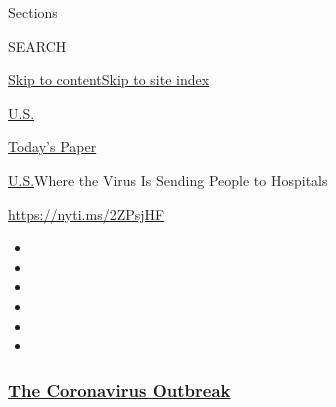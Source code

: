 Sections

SEARCH

\protect\hyperlink{site-content}{Skip to
content}\protect\hyperlink{site-index}{Skip to site index}

\href{https://www.nytimes3xbfgragh.onion/section/us}{U.S.}

\href{https://myaccount.nytimes3xbfgragh.onion/auth/login?response_type=cookie\&client_id=vi}{}

\href{https://www.nytimes3xbfgragh.onion/section/todayspaper}{Today's
Paper}

\href{/section/us}{U.S.}\textbar{}Where the Virus Is Sending People to
Hospitals

\url{https://nyti.ms/2ZPsjHF}

\begin{itemize}
\item
\item
\item
\item
\item
\item
\end{itemize}

\hypertarget{the-coronavirus-outbreak}{%
\subsubsection{\texorpdfstring{\href{https://www.nytimes3xbfgragh.onion/news-event/coronavirus?name=styln-coronavirus-national\&region=TOP_BANNER\&block=storyline_menu_recirc\&action=click\&pgtype=Interactive\&impression_id=7a017310-f1c8-11ea-8758-972576ee5dee\&variant=undefined}{The
Coronavirus
Outbreak}}{The Coronavirus Outbreak}}\label{the-coronavirus-outbreak}}

